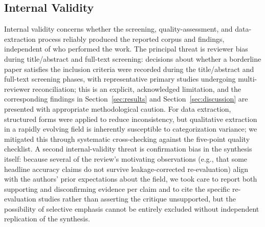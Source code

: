 \subsection{Internal Validity}
Internal validity concerns whether the screening, quality-assessment,
and data-extraction process reliably produced the reported corpus and
findings, independent of who performed the work. The principal threat
is reviewer bias during title/abstract and full-text screening:
decisions about whether a borderline paper satisfies the inclusion
criteria were recorded during the title/abstract and full-text screening phases,
with representative primary studies undergoing multi-reviewer reconciliation;
this is an explicit, acknowledged limitation, and the
corresponding findings in Section~\ref{sec:results} and
Section~\ref{sec:discussion} are presented with appropriate methodological caution.
For data extraction, structured forms were applied to reduce
inconsistency, but qualitative extraction in a rapidly evolving field
is inherently susceptible to categorization variance;
we mitigated this through systematic cross-checking against the five-point
quality checklist. A second internal-validity
threat is confirmation bias in the synthesis itself: because several
of the review's motivating observations (e.g., that some headline
accuracy claims do not survive leakage-corrected re-evaluation) align
with the authors' prior expectations about the field, we took care to
report both supporting and disconfirming evidence per claim and to
cite the specific re-evaluation studies rather than asserting the
critique unsupported, but the possibility of selective emphasis cannot
be entirely excluded without independent replication of the synthesis.

